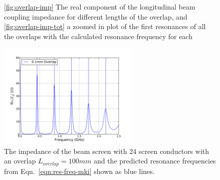 \begin{figure}
\label{fig:mki-overlap-imp-tot}
\caption{\ref{fig:overlap-imp} The real component of the longitudinal beam coupling impedance for different lengths of the overlap, and \ref{fig:overlap-imp-tot} a zoomed in plot of the first resonances of all the overlaps with the calculated resonance frequency for each}
\end{figure}

\begin{figure}
\begin{center}
\includegraphics[width=0.6\textwidth]{LHC_MKI/figures/mki-overlap-fres-100mm.pdf}
\end{center}
\label{fig:imp-overlap-fres}
\caption{The impedance of the beam screen with 24 screen conductors with an overlap $L_{overlap}=100mm$ and the predicted resonance frequencies from Eqn.~\ref{eqn:res-freq-mki} shown as blue lines.}
\end{figure}

